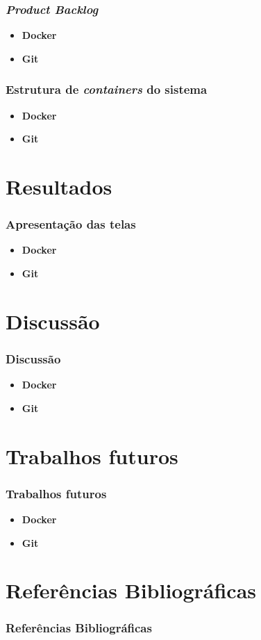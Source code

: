 \documentclass{beamer}
\begin{document}
\begin{frame}
    \frametitle{\textit{Product Backlog}}
    \begin{itemize}
        \item \textbf{Docker}
        \item \textbf{Git}
    \end{itemize}
\end{frame}


\begin{frame}
    \frametitle{Estrutura de \textit{containers} do sistema}
    \begin{itemize}
        \item \textbf{Docker}
        \item \textbf{Git}
    \end{itemize}
\end{frame}


\section{Resultados}
\begin{frame}
    \frametitle{Apresentação das telas}
    \begin{itemize}
        \item \textbf{Docker}
        \item \textbf{Git}
    \end{itemize}
\end{frame}


\section{Discussão}
\begin{frame}
    \frametitle{Discussão}
    \begin{itemize}
        \item \textbf{Docker}
        \item \textbf{Git}
    \end{itemize}
\end{frame}


\section{Trabalhos futuros}
\begin{frame}
    \frametitle{Trabalhos futuros}
    \begin{itemize}
        \item \textbf{Docker}
        \item \textbf{Git}
    \end{itemize}

    
\end{frame}

    

\section{Referências Bibliográficas}

\begin{frame}
    \frametitle{Referências Bibliográficas}
    \scriptsize{  
        
        
    }
  
\end{frame}
\end{document}
